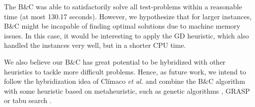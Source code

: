 \documentclass{ro}
\begin{document}


The  B\&C was able to satisfactorily solve all test-problems within a reasonable time (at most 130.17 seconds). However,  we hypothesize that for larger instances, B\&C might  be incapable of finding optimal solutions due to machine memory issues. In this case, it would be interesting to apply the GD heuristic, which also handled the instances very well, but in a shorter CPU time.

We also believe our B\&C has great potential to be hybridized with other heuristics to tackle more difficult problems. Hence, as future work, we intend to follow the hybridization idea of Cl\'imaco \textit{et al.}\cite{climaco2018} and combine the B\&C algorithm with some heuristic based on metaheuristic, such as genetic algorithms \cite{kramer2017genetic}, GRASP \cite{resende2016optimization} or tabu search \cite{laguna2018tabu}.





\end{document}
